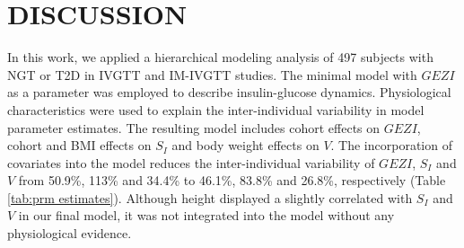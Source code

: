 \documentclass[utf8]{frontiersSCNS} %
\begin{document}
\section{DISCUSSION}
In this work, we applied a hierarchical modeling analysis of 497 subjects with NGT or T2D in IVGTT and IM-IVGTT studies. The minimal model with $GEZI$ as a parameter was employed to describe insulin-glucose dynamics. Physiological characteristics were used to explain the inter-individual variability in model parameter estimates. The resulting model includes cohort effects on $GEZI$, cohort and BMI effects on $S_I$ and body weight effects on $V$. The incorporation of covariates into the model reduces the inter-individual variability of $GEZI$, $S_I$ and $V$ from 50.9\%,  113\% and 34.4\% to 46.1\%, 83.8\% and 26.8\%, respectively (Table \ref{tab:prm estimates}). Although height displayed a slightly correlated with $S_I$ and $V$ in our final model, it was not integrated into the model without any physiological evidence.  
\end{document}

